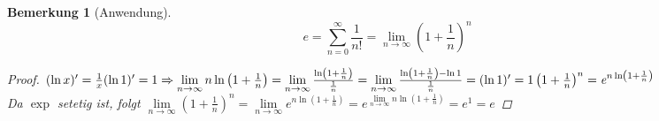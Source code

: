 \documentclass[a4paper,titlepage,oneside]{article}
\def\e{\ensuremath{\mathit{e}} }
\newcommand{\suminf}[2][n]{\ensuremath{\sum_{#1= 0}^{\infty}{#2}}}
\renewcommand{\liminf}[2][n]{\ensuremath{\lim\limits_{#1 \rightarrow \infty}{#2}}}
\theoremstyle{thmstyle}
\newtheorem{bem}[satz]{Bemerkung}
\begin{document}
\begin{bem}[Anwendung]
\[\e = \suminf{\frac{1}{n!}} = \liminf{\left( 1 + \frac{1}{n}\right)^n}\]
\begin{proof}
$(\ln x)' = \frac{1}{x} \\
(\ln 1)' = 1 \\
\Rightarrow \liminf{ n \ln\left(1 + \frac{1}{n}\right)} = \liminf{\frac{\ln\left(1 + \frac{1}{n}\right)}{\frac{1}{n}}} = \liminf{\frac{\ln\left(1  + \frac{1}{n}\right) - \ln 1}{\frac{1}{n}}} = (\ln 1)' = 1\\
\left(1  + \frac{1}{n}\right)^n = \e^{n\ln \left(1  + \frac{1}{n}\right)}$\\
Da $\exp$ setetig ist, folgt $ \liminf{\left(1  + \frac{1}{n}\right)^n} = \liminf{\e^{n\ln \left(1  + \frac{1}{n}\right)}} = \e^{\liminf{n\ln \left(1  + \frac{1}{n}\right)}} = \e^1 = \e$
\end{proof}
\end{bem}
\end{document}
